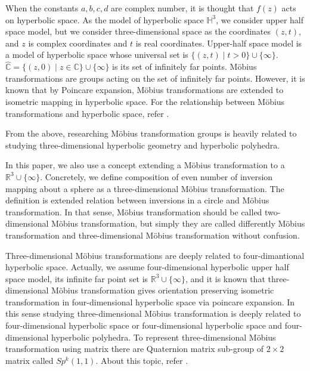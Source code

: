 When the constants $a, b, c, d$ are complex number, it is thought that
$f(z)$ acts on hyperbolic space.
As the model of hyperbolic space $\mathbb{H}^3$, we consider upper half
space model, but we consider three-dimensional space as the coordinates
$(z, t)$, and $z$ is complex coordinates and $t$ is real coordinates.
Upper-half space model is a model of hyperbolic space whose universal
set is $\{(z,t) \mid t>0\}\cup \{ \infty \}$.
$\hat{\mathbb{C}} = \{ (z,0) \mid z \in \mathbb{C}\} \cup \{ \infty\}$
is its set of infinitely far points. M\"obius transformations are groups acting on
the set of infinitely far points. However, it is known that by Poincare
expansion, M\"obius transformations are extended to isometric mapping
in hyperbolic space.
For the relationship between M\"obius transformations and hyperbolic
space, refer 
\cite{Marden200705outerCircles}\cite{taniguchi_okumura199610invitation}.

From the above, researching M\"obius transformation groups is heavily
related to studying three-dimensional hyperbolic geometry and hyperbolic
polyhedra.

In this paper, we also use a concept extending a M\"obius
transformation to a $\mathbb{R}^3\cup\{\infty\}$.
Concretely, we define composition of even number of inversion mapping
about a sphere as a three-dimensional M\"obius transformation.
The definition is extended relation between inversions in a circle and
M\"obius transformation.
In that sense, M\"obius transformation should be called two-dimensional
M\"obius transformation, but
simply they are called differently M\"obius transformation and
three-dimensional M\"obius transformation without confusion.

Three-dimensional M\"obius transformations are deeply related to
four-dimantional hyperbolic space. Actually, we assume four-dimensional
hyperbolic upper half space model, its infinite far point set is
$\mathbb{R}^3\cup\{\infty\}$, and it is known that three-dimensional M\"obius
transformation gives orientation preserving isometric transformation in
four-dimensional hyperbolic space via poincare expansion.
In this sense studying three-dimensional M\"obius transformation is
deeply related to four-dimensional hyperbolic space or four-dimensional
hyperbolic space and four-dimensional hyperbolic polyhedra.
To represent three-dimensional M\"obius transformation using matrix
there are Quaternion matrix sub-group of $2 \times 2$ matrix called
$Sp^k(1,1)$. About this topic, refer
\cite{sakugawa2010limit}\cite{sakugawa2007master}.


